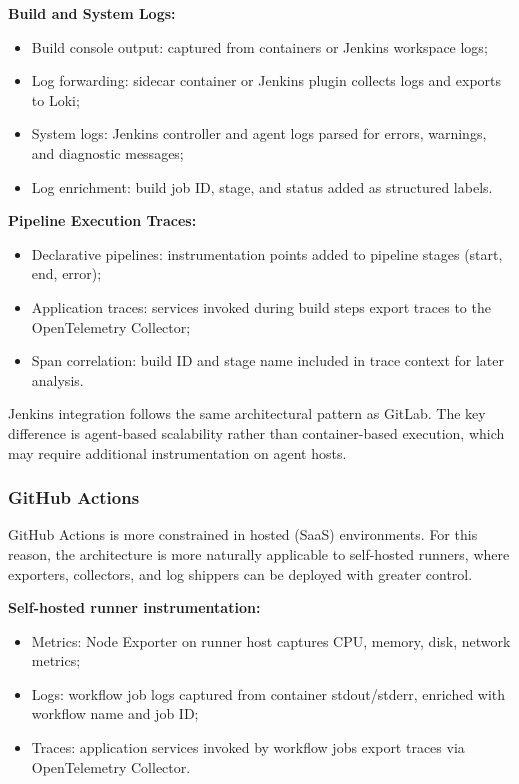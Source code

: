 \textbf{Build and System Logs:}
\begin{itemize}
    \item Build console output: captured from containers or Jenkins workspace logs;
    \item Log forwarding: sidecar container or Jenkins plugin collects logs and exports to Loki;
    \item System logs: Jenkins controller and agent logs parsed for errors, warnings, and diagnostic messages;
    \item Log enrichment: build job ID, stage, and status added as structured labels.
\end{itemize}

\textbf{Pipeline Execution Traces:}
\begin{itemize}
    \item Declarative pipelines: instrumentation points added to pipeline stages (start, end, error);
    \item Application traces: services invoked during build steps export traces to the OpenTelemetry Collector;
    \item Span correlation: build ID and stage name included in trace context for later analysis.
\end{itemize}

Jenkins integration follows the same architectural pattern as GitLab. The key difference is agent-based scalability rather than container-based execution, which may require additional instrumentation on agent hosts.

\subsubsection{GitHub Actions}
\label{subsubsec:github_integration}

GitHub Actions is more constrained in hosted (SaaS) environments. For this reason, the architecture is more naturally applicable to self-hosted runners, where exporters, collectors, and log shippers can be deployed with greater control.

\textbf{Self-hosted runner instrumentation:}
\begin{itemize}
    \item Metrics: Node Exporter on runner host captures CPU, memory, disk, network metrics;
    \item Logs: workflow job logs captured from container stdout/stderr, enriched with workflow name and job ID;
    \item Traces: application services invoked by workflow jobs export traces via OpenTelemetry Collector.
\end{itemize}

